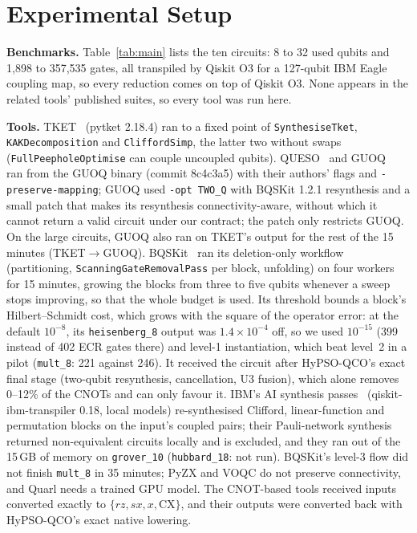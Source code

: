 \documentclass[conference,letterpaper]{IEEEtran}
\newcommand{\cir}[1]{\texttt{#1}}
\newcommand{\tool}[1]{\texttt{#1}}
\newcommand{\hypso}{HyPSO-QCO}
\begin{document}
\section{Experimental Setup}\label{sec:setup}



\textbf{Benchmarks.} Table~\ref{tab:main} lists the ten circuits: 8 to 32 used qubits and 1,898 to 357,535
gates, all transpiled by Qiskit O3 for a 127-qubit IBM Eagle coupling map, so every reduction comes on top of
Qiskit O3. None appears in the related tools' published suites, so every tool was run here.

\textbf{Tools.} TKET~\cite{tket} (pytket 2.18.4) ran to a fixed point of \tool{SynthesiseTket},
\tool{KAKDecomposition} and \tool{CliffordSimp}, the latter two without swaps (\tool{FullPeepholeOptimise}
can couple uncoupled qubits). QUESO~\cite{queso} and GUOQ~\cite{guoq} ran from the GUOQ binary (commit
8c4c3a5) with their authors' flags and \tool{-preserve-mapping}; GUOQ used \tool{-opt TWO\_Q} with BQSKit
1.2.1 resynthesis and a small patch that makes its resynthesis connectivity-aware, without which it cannot
return a valid circuit under our contract; the patch only restricts GUOQ. On the large circuits, GUOQ also
ran on TKET's output for the rest of the 15 minutes (TKET$\to$GUOQ). BQSKit~\cite{bqskit} ran its
deletion-only workflow (partitioning, \tool{ScanningGateRemovalPass} per block, unfolding) on four workers
for 15 minutes, growing the blocks from three to five qubits whenever a sweep stops improving, so that the
whole budget is used. Its threshold bounds a block's Hilbert--Schmidt cost, which grows with the square of
the operator error: at the default $10^{-8}$, its \cir{heisenberg\_8} output was $1.4\times10^{-4}$ off, so we
used $10^{-15}$ (399 instead of 402 ECR gates there) and level-1 instantiation, which beat level~2 in a pilot
(\cir{mult\_8}: 221 against 246). It received the circuit after \hypso{}'s exact final stage (two-qubit
resynthesis, cancellation, U3 fusion), which alone removes 0--12\% of the CNOTs and can only favour it. IBM's
AI synthesis passes~\cite{kremer2024,dubal2025} (qiskit-ibm-transpiler 0.18, local models) re-synthesised
Clifford, linear-function and permutation blocks on the input's coupled pairs; their Pauli-network synthesis
returned non-equivalent circuits locally and is excluded, and they ran out of the 15\,GB of memory on
\cir{grover\_10} (\cir{hubbard\_18}: not run). BQSKit's level-3 flow did not finish \cir{mult\_8} in
35 minutes; PyZX and VOQC do not preserve connectivity, and Quarl needs a trained GPU model. The CNOT-based
tools received inputs converted exactly to $\{rz, sx, x, \mathrm{CX}\}$, and their outputs were converted back
with \hypso{}'s exact native lowering.
\end{document}

